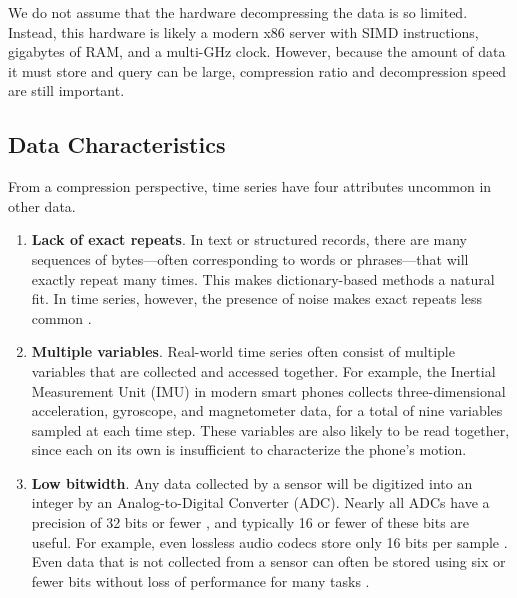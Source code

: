We do not assume that the hardware decompressing the data is so limited. Instead, this hardware is likely a modern x86 server with SIMD instructions, gigabytes of RAM, and a multi-GHz clock. However, because the amount of data it must store and query can be large, compression ratio and decompression speed are still important.

\subsection{Data Characteristics}

From a compression perspective, time series have four attributes uncommon in other data.

\begin{enumerate}
    \item \textbf{Lack of exact repeats}. In text or structured records, there are many sequences of bytes---often corresponding to words or phrases---that will exactly repeat many times. This makes dictionary-based methods a natural fit. In time series, however, the presence of noise makes exact repeats less common \cite{extract, epenthesis}.
    \item \textbf{Multiple variables}. Real-world time series often consist of multiple variables that are collected and accessed together. For example, the Inertial Measurement Unit (IMU) in modern smart phones collects three-dimensional acceleration, gyroscope, and magnetometer data, for a total of nine variables sampled at each time step. These variables are also likely to be read together, since each on its own is insufficient to characterize the phone's motion. %
    \item \textbf{Low bitwidth}. Any data collected by a sensor will be digitized into an integer by an Analog-to-Digital Converter (ADC). Nearly all ADCs have a precision of 32 bits or fewer \cite{digikeyADCs}, and typically 16 or fewer of these bits are useful. For example, even lossless audio codecs store only 16 bits per sample \cite{flac, shorten}. Even data that is not collected from a sensor can often be stored using six or fewer bits without loss of performance for many tasks \cite{epenthesis, mdlIntrinsic, sax}.

\end{enumerate}
